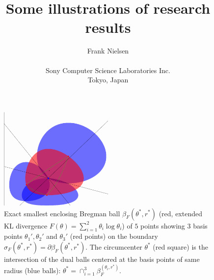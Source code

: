 \documentclass[11pt]{article}
\begin{document}
%
\title{Some illustrations of research results}

\author{Frank Nielsen\\ \ \\ Sony Computer Science Laboratories Inc.\\ Tokyo, Japan}

\date{}


\maketitle  


\begin{figure}
\centering
\includegraphics[width=0.5\textwidth]{eKLminiball-5pts-3pts-basis.png}

\caption{Exact smallest enclosing Bregman ball $\beta_F(\theta^*,r^*)$ (red, extended KL divergence $F(\theta)=\sum_{i=1}^2 \theta_i\log\theta_i$) of $5$ points showing $3$ basis points $\theta_1', \theta_2'$ and $\theta_3'$ (red points) on the boundary $\sigma_F(\theta^*,r^*)=\partial\beta_F(\theta^*,r^*)$.
The circumcenter $\theta^*$ (red square) is the intersection of the dual balls centered at the basis points of same radius (blue balls):
$\theta^*=\cap_{i=1}^3 \beta_F^(\theta_i,r^*)$.}\label{fig:minibball}

\end{figure}
\end{document}
